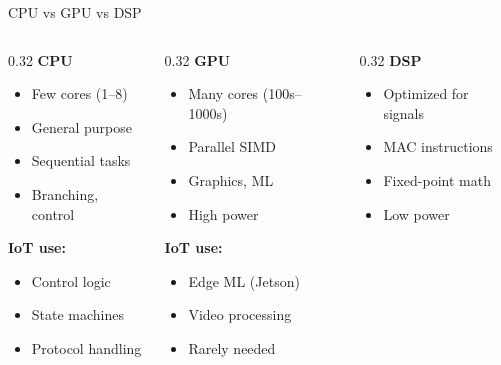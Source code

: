 \documentclass[aspectratio=169,11pt]{beamer}
\begin{document}
\begin{frame}{CPU vs GPU vs DSP}
    \begin{columns}[T]
        \begin{column}{0.32\textwidth}
            \textbf{CPU}
            \begin{itemize}
                \item Few cores (1--8)
                \item General purpose
                \item Sequential tasks
                \item Branching, control
            \end{itemize}
            
            \vspace{0.2cm}
            \textbf{IoT use:}
            \begin{itemize}
                \item Control logic
                \item State machines
                \item Protocol handling
            \end{itemize}
        \end{column}
        \begin{column}{0.32\textwidth}
            \textbf{GPU}
            \begin{itemize}
                \item Many cores (100s--1000s)
                \item Parallel SIMD
                \item Graphics, ML
                \item High power
            \end{itemize}
            
            \vspace{0.2cm}
            \textbf{IoT use:}
            \begin{itemize}
                \item Edge ML (Jetson)
                \item Video processing
                \item Rarely needed
            \end{itemize}
        \end{column}
        \begin{column}{0.32\textwidth}
            \textbf{DSP}
            \begin{itemize}
                \item Optimized for signals
                \item MAC instructions
                \item Fixed-point math
                \item Low power
            \end{itemize}
            

\end{column}
\end{columns}
\end{frame}
\end{document}
